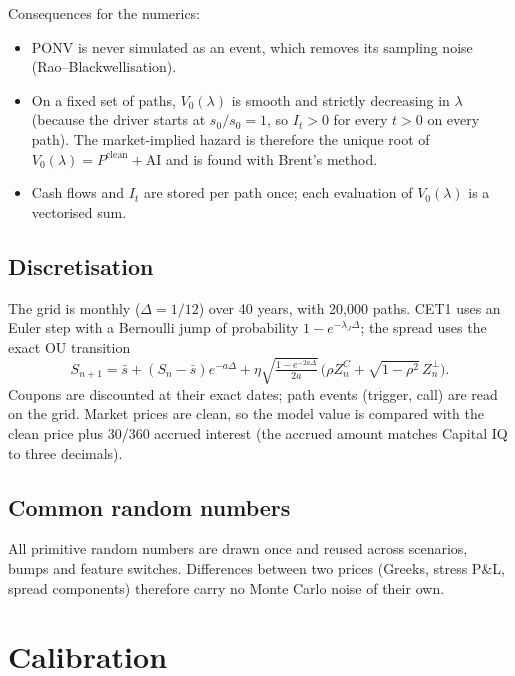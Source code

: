 \documentclass[11pt]{article}
\newcommand{\1}{\mathbf{1}}
\begin{document}
Consequences for the numerics:
\begin{itemize}
  \item PONV is never simulated as an event, which removes its sampling noise
  (Rao--Blackwellisation).
  \item On a fixed set of paths, $V_0(\lambda)$ is smooth and strictly decreasing
  in $\lambda$ (because the driver starts at $s_0/s_0=1$, so $I_t>0$ for every $t>0$ on every path). The market-implied hazard is therefore the unique root of
  $V_0(\lambda)=P^{\mathrm{clean}}+\mathrm{AI}$ and is found with Brent's method.
  \item Cash flows and $I_t$ are stored per path once; each evaluation of
  $V_0(\lambda)$ is a vectorised sum.
\end{itemize}

\subsection{Discretisation}
The grid is monthly ($\Delta=1/12$) over 40 years, with 20{,}000 paths.
CET1 uses an Euler step with a Bernoulli jump of probability
$1-e^{-\lambda_J\Delta}$; the spread uses the exact OU transition
\[
  S_{n+1}=\bar s+(S_n-\bar s)e^{-a\Delta}
  +\eta\sqrt{\tfrac{1-e^{-2a\Delta}}{2a}}\,
  \bigl(\rho Z^C_n+\sqrt{1-\rho^2}\,Z^\perp_n\bigr).
\]
Coupons are discounted at their exact dates; path events (trigger, call) are
read on the grid. Market prices are clean, so the model value is compared with
the clean price plus 30/360 accrued interest (the accrued amount matches Capital
IQ to three decimals).

\subsection{Common random numbers}
All primitive random numbers are drawn once and reused across scenarios,
bumps and feature switches. Differences between two prices (Greeks, stress
P\&L, spread components) therefore carry no Monte Carlo noise of their own.

\section{Calibration}\label{sec:calib}
\end{document}
